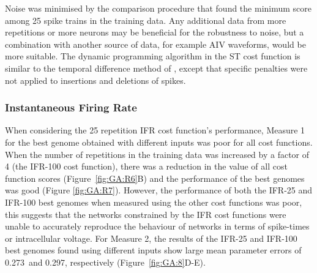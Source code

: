 \smallskip{}

Noise was minimised by the comparison procedure that found the minimum
score among 25 spike trains in the training data. Any additional data from
more repetitions or more neurons may be beneficial for the robustness to
noise, but a combination with another source of data, for example AIV
waveforms, would be more suitable. The dynamic programming algorithm in the
ST cost function is similar to the temporal difference method of
\citet{VictorGoldbergEtAl:2007}, except that specific penalties were not
applied to insertions and deletions of spikes.


\subsubsection{Instantaneous Firing Rate }\label{sec:GA:inst-firing-rate-summ}

 When
considering the 25 repetition IFR cost function's performance, Measure 1
for the best genome obtained with different inputs was poor for all cost
functions. When the number of repetitions in the training data was
increased by a factor of 4 (the IFR-100 cost function), there was a
reduction in the value of all cost function scores
(Figure~\ref{fig:GA:R6}B) and the performance of the best genomes was good
(Figure \ref{fig:GA:R7}). However, the performance of both the IFR-25 and
IFR-100 best genomes when measured using the other cost functions was poor,
this suggests that the networks constrained by the IFR cost functions were
unable to accurately reproduce the behaviour of networks in terms of
spike-times or intracellular
voltage. %
For Measure 2, the results of the IFR-25 and IFR-100 best genomes found using
different inputs show large mean parameter errors of 0.273~and 0.297,
respectively (Figure~\ref{fig:GA:8}D-E).

